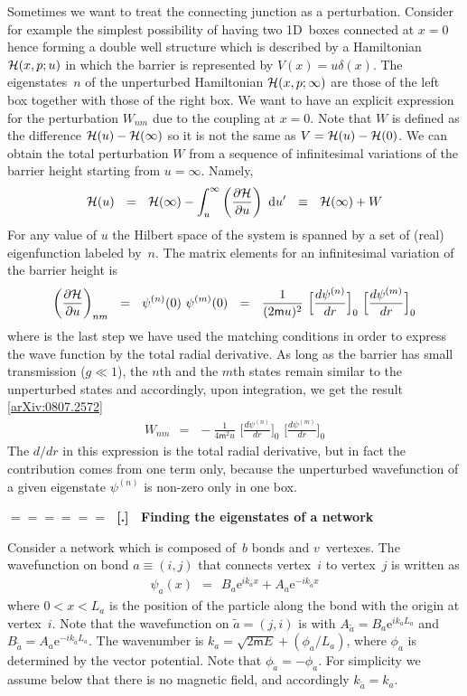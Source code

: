 \documentclass[onecolumn,fleqn]{revtex4}
\newcommand{\eexp}{\mathrm{e}^}
\newcommand{\mass}{\mathsf{m}}
\newcommand{\beq}{\begin{eqnarray}}
\newcommand{\eeq}{\end{eqnarray}}
\renewcommand{\thesubsection}{\arabic{subsection}}
\renewcommand{\thesubsubsection}{\arabic{subsubsection}}
\newcommand{\sheadC}[1]
{
\addtocounter{subsubsection}{1}
\vspace{5mm}
{\Large\bf $=\!=\!=\!=\!=\!=\;$ [\thesubsection.\thesubsubsection] \ #1}  
\nopagebreak
\phantomsection
}
\begin{document}
Sometimes we want to treat the connecting junction 
as a perturbation. Consider for example 
the simplest possibility of having two 1D~boxes 
connected at ${x=0}$ hence forming a double well structure
which is described by a Hamiltonian ${\cal H}(x,p;u)$ 
in which the barrier is represented by $V(x)=u\delta(x)$.
The eigenstates~$n$ of the unperturbed Hamiltonian ${\cal H}(x,p;\infty)$
are those of the left box together with those of the right box.     
We want to have an explicit expression for the 
perturbation $W_{nm}$ due to the coupling at ${x=0}$. 
Note that $W$ is defined as 
the difference ${{\cal H}(u)-{\cal H}(\infty)}$ 
so it is not the same as  ${V={\cal H}(u)-{\cal H}(0)}$.  
We can obtain the total perturbation $W$ 
from  a sequence of infinitesimal variations 
of the barrier height starting from ${u=\infty}$. 
Namely, 
\beq
{\cal H}(u) \ \ = \ \ 
{\cal H}(\infty)
-\int^{\infty}_{u}
\left(\frac{\partial{\cal H}}{\partial u}\right) \ \mbox{d}u' 
\ \ \equiv \ \ {\cal H}(\infty)+W
\eeq
For any value of $u$ the Hilbert space of the system 
is spanned by a set of (real) eigenfunction labeled by~$n$. 
The matrix elements for an infinitesimal variation 
of the barrier height is 
\beq
\left(\frac{\partial{\cal H}}{\partial u}\right)_{nm}
\ \ = \ \ \psi^{(n)}(0) \,\, \psi^{(m)}(0)
\ \ = \ \ 
\frac{1}{(2\mass u)^2}
\,\,
\Big[\frac{d\psi^{(n)}}{dr}\Big]_{0}
\,\,
\Big[\frac{d\psi^{(m)}}{dr}\Big]_{0}
\eeq
where is the last step we have used the matching conditions 
in order to express the wave function 
by the total radial derivative.
As long as the barrier has small transmission ($g{\ll 1}$), 
the $n$th and the $m$th states 
remain similar to the unperturbed states and accordingly, 
upon integration, we get the result [\href{http://arxiv.org/abs/0807.2572}{arXiv:0807.2572}]
\beq
W_{nm} \ \ = \ \ 
-\frac{1}{4\mass^2 u}
\,\,
\Big[\frac{d\psi^{(n)}}{dr}\Big]_{0}
\,\,
\Big[\frac{d\psi^{(m)}}{dr}\Big]_{0}
\eeq
The $d/dr$ in this expression is the total radial derivative, 
but in fact the contribution comes from one term only, 
because the unperturbed wavefunction of a given eigenstate $\psi^{(n)}$ 
is non-zero only in one box.


\sheadC{Finding the eigenstates of a network}

Consider a network which is composed of~$b$ bonds and $v$~vertexes.
The wavefunction on bond ${a\equiv(i,j)}$  
that connects vertex~$i$ to vertex~$j$ is written as
\beq
\psi_a(x) \ \ = \ \ 
B_a \eexp{ik_a x} + A_a \eexp{-ik_{\tilde{a}} x} 
\eeq
where $0<x<L_a$ is the position of the particle along the bond 
with the origin at vertex~$i$. Note that the wavefunction 
on $\tilde{a}=(j,i)$ is with ${A_{\tilde{a}}=B_a\eexp{ik_aL_a}}$
and ${B_{\tilde{a}}=A_a\eexp{-ik_{\tilde{a}}L_a}}$.
The wavenumber is $k_a = \sqrt{2\mass E} + (\phi_a/L_a)$, 
where $\phi_a$ is determined by the vector potential.  
Note that $\phi_{\tilde{a}}=-\phi_a$.
For simplicity we assume below that there is no magnetic 
field, and accordingly ${k_{\tilde{a}}=k_a}$.
\end{document}
